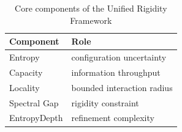 \begin{table}[h]
\centering
\begin{tabular}{ll}
Component & Role \\
\midrule
Entropy & configuration uncertainty \\
Capacity & information throughput \\
Locality & bounded interaction radius \\
Spectral Gap & rigidity constraint \\
EntropyDepth & refinement complexity \\
\end{tabular}
\caption{Core components of the Unified Rigidity Framework}
\end{table}
